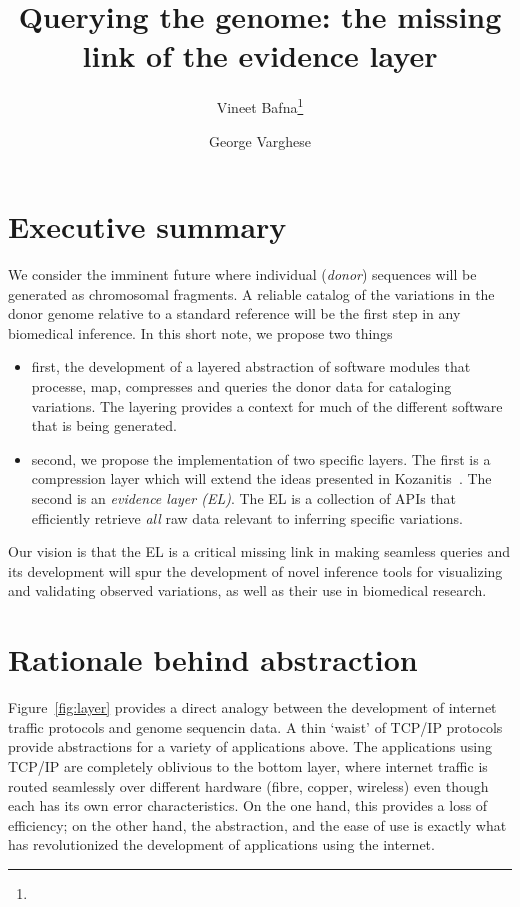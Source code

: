 \documentclass[11pt]{article}
\begin{document}
\title{Querying the genome: the missing link of the evidence layer} 
\author{Vineet Bafna\thanks{} \and George Varghese}
\maketitle
\section{Executive summary}
We consider the imminent future where individual (\emph{donor})
sequences will be generated as chromosomal fragments. A reliable
catalog of the variations in the donor genome relative to a standard
reference will be the first step in any biomedical inference. In this
short note, we propose two things
\begin{itemize}
\item first, the development of a layered abstraction of software
  modules that processe, map, compresses and queries the donor data
  for cataloging variations. The layering provides a context for much
  of the different software that is being generated.
\item second, we propose the implementation of two specific
  layers. The first is a compression layer which will extend the ideas
  presented in Kozanitis~\cite{}. The second is an \emph{evidence
    layer (EL)}. The EL is a collection of APIs that efficiently
  retrieve \emph{all} raw data relevant to inferring specific
  variations. 
\end{itemize}

Our vision is that the EL is a critical missing link in making
seamless queries and its development will spur the development of
novel inference tools for visualizing and validating observed
variations, as well as their use in biomedical research.


\section{Rationale behind abstraction}
Figure~\ref{fig:layer} provides a direct analogy between the
development of internet traffic protocols and genome sequencin data.
A thin `waist' of TCP/IP protocols provide abstractions for a variety
of applications above. The applications using TCP/IP are completely
oblivious to the bottom layer, where internet traffic is routed
seamlessly over different hardware (fibre, copper, wireless) even
though each has its own error characteristics.  On the one hand, this
provides a loss of efficiency; on the other hand, the abstraction, and
the ease of use is exactly what has revolutionized the development of
applications using the internet.
\end{document}
